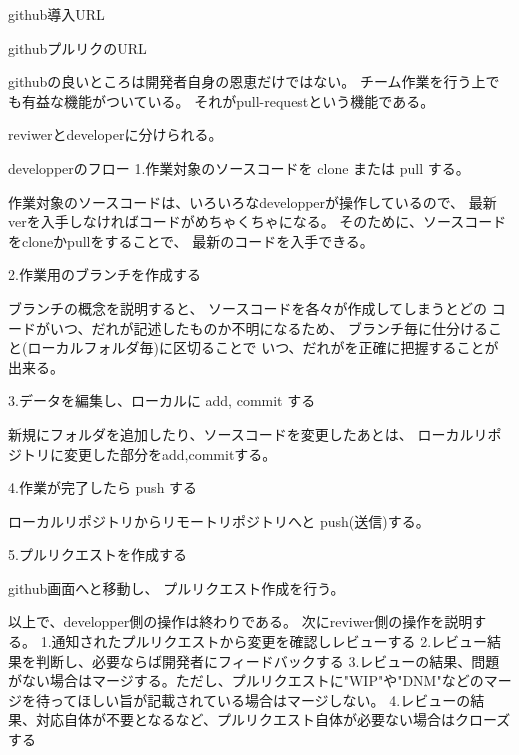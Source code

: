\documentclass{jsarticle}
\begin{document}
github導入URL

githubプルリクのURL

githubの良いところは開発者自身の恩恵だけではない。
チーム作業を行う上でも有益な機能がついている。
それがpull-requestという機能である。

reviwerとdeveloperに分けられる。

developperのフロー
1.作業対象のソースコードを clone または pull する。

作業対象のソースコードは、いろいろなdevelopperが操作しているので、
最新verを入手しなければコードがめちゃくちゃになる。
そのために、ソースコードをcloneかpullをすることで、
最新のコードを入手できる。

2.作業用のブランチを作成する

ブランチの概念を説明すると、
ソースコードを各々が作成してしまうとどの
コードがいつ、だれが記述したものか不明になるため、
ブランチ毎に仕分けること(ローカルフォルダ毎)に区切ることで
いつ、だれがを正確に把握することが出来る。

3.データを編集し、ローカルに add, commit する

新規にフォルダを追加したり、ソースコードを変更したあとは、
ローカルリポジトリに変更した部分をadd,commitする。

4.作業が完了したら push する

ローカルリポジトリからリモートリポジトリへと
push(送信)する。

5.プルリクエストを作成する

github画面へと移動し、
プルリクエスト作成を行う。

以上で、developper側の操作は終わりである。
次にreviwer側の操作を説明する。
1.通知されたプルリクエストから変更を確認しレビューする
2.レビュー結果を判断し、必要ならば開発者にフィードバックする
3.レビューの結果、問題がない場合はマージする。ただし、プルリクエストに"WIP"や"DNM"などのマージを待ってほしい旨が記載されている場合はマージしない。
4.レビューの結果、対応自体が不要となるなど、プルリクエスト自体が必要ない場合はクローズする
\end{document}
